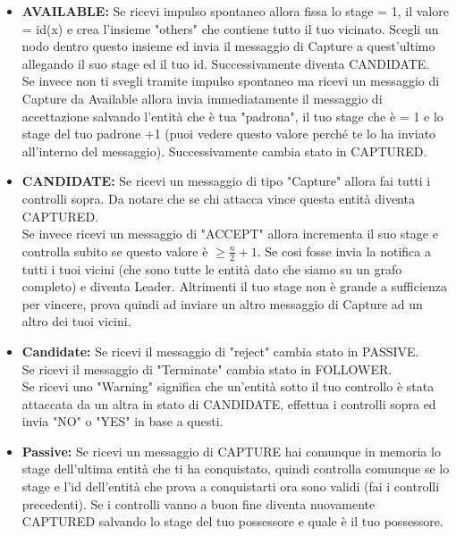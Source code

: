 \begin{itemize}
    \item \textbf{AVAILABLE:} Se ricevi impulso spontaneo allora fissa lo stage =
          1, il valore = id(x) e crea l'insieme "others" che contiene tutto il tuo
          vicinato. Scegli un nodo dentro questo insieme ed invia il messaggio di
          Capture a quest'ultimo allegando il suo stage ed il tuo id. Successivamente
          diventa CANDIDATE.\\
          Se invece non ti svegli tramite impulso spontaneo ma ricevi un messaggio
          di Capture da Available allora invia immediatamente il messaggio di
          accettazione salvando l'entità che è tua "padrona", il tuo stage che è =
          1 e lo stage del tuo padrone +1 (puoi vedere questo valore perché te lo
          ha inviato all'interno del messaggio). Successivamente cambia stato in
          CAPTURED.
    \item \textbf{CANDIDATE:} Se ricevi un messaggio di tipo "Capture" allora fai
          tutti i controlli sopra. Da notare che se chi attacca vince questa entità
          diventa CAPTURED.\\
          Se invece ricevi un messaggio di "ACCEPT" allora incrementa il suo stage
          e controlla subito se questo valore è $\geq \frac{n}{2} +1$. Se cosi
          fosse invia la notifica a tutti i tuoi vicini (che sono tutte le entità
          dato che siamo su un grafo completo) e diventa Leader. Altrimenti il tuo
          stage non è grande a sufficienza per vincere, prova quindi ad inviare un
          altro messaggio di Capture ad un altro dei tuoi vicini.
    \item \textbf{Candidate:} Se ricevi il messaggio di "reject" cambia stato in
          PASSIVE. \\ Se ricevi il messaggio di "Terminate" cambia stato in
          FOLLOWER. \\ Se ricevi uno "Warning" significa che un'entità sotto il
          tuo controllo è stata attaccata da un altra in stato di CANDIDATE,
          effettua i controlli sopra ed invia "NO" o "YES" in base a questi.
    \item \textbf{Passive:} Se ricevi un messaggio di CAPTURE hai comunque in
          memoria lo stage dell'ultima entità che ti ha conquistato, quindi controlla
          comunque se lo stage e l'id dell'entità che prova a conquistarti ora sono
          validi (fai i controlli precedenti). Se i controlli vanno a buon fine diventa
          nuovamente CAPTURED salvando lo stage del tuo possessore e quale è il tuo
          possessore.
\end{itemize}

